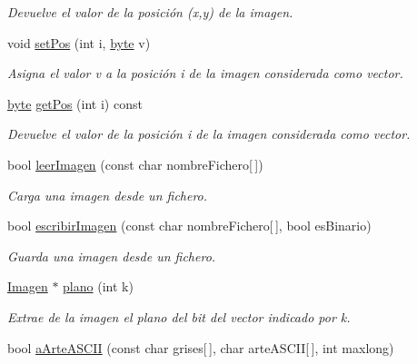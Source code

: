 \begin{DoxyCompactItemize}
\begin{DoxyCompactList}\small\item\em Devuelve el valor de la posición ({\itshape x},{\itshape y}) de la imagen. \end{DoxyCompactList}\item 
void \hyperlink{class_imagen_a9c1bfd9bff6ae8851f3e0c9ac2e90382}{set\+Pos} (int i, \hyperlink{imagen_8h_a0c8186d9b9b7880309c27230bbb5e69d}{byte} v)
\begin{DoxyCompactList}\small\item\em Asigna el valor {\itshape v} a la posición {\itshape i} de la imagen considerada como vector. \end{DoxyCompactList}\item 
\hyperlink{imagen_8h_a0c8186d9b9b7880309c27230bbb5e69d}{byte} \hyperlink{class_imagen_a00b702abaaf3261ade141597beb7bc55}{get\+Pos} (int i) const 
\begin{DoxyCompactList}\small\item\em Devuelve el valor de la posición {\itshape i} de la imagen considerada como vector. \end{DoxyCompactList}\item 
bool \hyperlink{class_imagen_aa46cc99da218afa01f55395e4c96ffe0}{leer\+Imagen} (const char nombre\+Fichero\mbox{[}$\,$\mbox{]})
\begin{DoxyCompactList}\small\item\em Carga una imagen desde un fichero. \end{DoxyCompactList}\item 
bool \hyperlink{class_imagen_aec07c487f3cb1ea1fdd26cb555f02ed1}{escribir\+Imagen} (const char nombre\+Fichero\mbox{[}$\,$\mbox{]}, bool es\+Binario)
\begin{DoxyCompactList}\small\item\em Guarda una imagen desde un fichero. \end{DoxyCompactList}\item 
\hyperlink{class_imagen}{Imagen} $\ast$ \hyperlink{class_imagen_a738d3b88a80606af9d78458e5586e04c}{plano} (int k)
\begin{DoxyCompactList}\small\item\em Extrae de la imagen el plano del bit del vector indicado por {\itshape k}. \end{DoxyCompactList}\item 
bool \hyperlink{class_imagen_aa5c1f94763ca1774792548daa3d0e793}{a\+Arte\+A\+S\+C\+I\+I} (const char grises\mbox{[}$\,$\mbox{]}, char arte\+A\+S\+C\+I\+I\mbox{[}$\,$\mbox{]}, int maxlong)

\end{DoxyCompactItemize}

